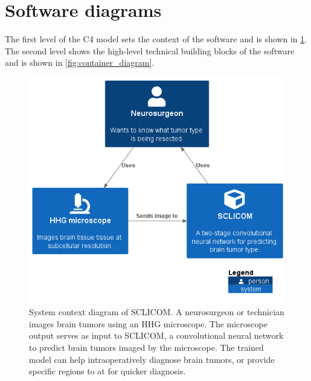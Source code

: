 \section{Software diagrams}\label{app:sclicom_c4}
The first level of the C4 model sets the context of the software and is shown in \cref{fig:context_diagram}.
The second level shows the high-level technical building blocks of the software and is shown in \cref{fig:container_diagram}.

\begin{figure}[b!]
    \centering
    \includegraphics[width=\linewidth]{images/System_context_diagram.png}
    \caption[SCLICOM system context diagram]{
        System context diagram of SCLICOM.
        A neurosurgeon or technician images brain tumors using an HHG microscope.
        The microscope output serves as input to SCLICOM, a convolutional neural network to predict brain tumors imaged by the microscope.
        The trained model can help intraoperatively diagnose brain tumors, or provide specific regions to at for quicker diagnosis.
    }
    \label{fig:context_diagram}
\end{figure}


